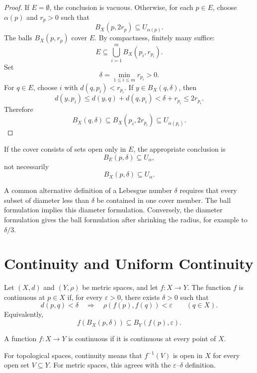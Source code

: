 \documentclass[answers,12pt,addpoints]{exam}
\begin{document}
\begin{proof}
If $E=\emptyset$, the conclusion is vacuous.
Otherwise, for each $p\in E$, choose $\alpha(p)$ and
$r_p>0$ such that
\[
B_X(p,2r_p)\subseteq U_{\alpha(p)}.
\]
The balls $B_X(p,r_p)$ cover $E$. By compactness, finitely
many suffice:
\[
E\subseteq\bigcup_{i=1}^{m}B_X(p_i,r_{p_i}).
\]
Set
\[
\delta=\min_{1\leq i\leq m}r_{p_i}>0.
\]
For $q\in E$, choose $i$ with $d(q,p_i)<r_{p_i}$.
If $y\in B_X(q,\delta)$, then
\[
d(y,p_i)
\leq d(y,q)+d(q,p_i)
<\delta+r_{p_i}
\leq 2r_{p_i}.
\]
Therefore
\[
B_X(q,\delta)
\subseteq B_X(p_i,2r_{p_i})
\subseteq U_{\alpha(p_i)}.
\]
\end{proof}

\begin{remark}
If the cover consists of sets open only in $E$, the
appropriate conclusion is
\[
B_E(p,\delta)\subseteq U_\alpha,
\]
not necessarily
\[
B_X(p,\delta)\subseteq U_\alpha.
\]

A common alternative definition of a Lebesgue number
$\delta$ requires that every subset of diameter less than
$\delta$ be contained in one cover member.
The ball formulation implies this diameter formulation.
Conversely, the diameter formulation gives the ball
formulation after shrinking the radius, for example
to $\delta/3$.
\end{remark}

\section{Continuity and Uniform Continuity}

\begin{definition}
Let $(X,d)$ and $(Y,\rho)$ be metric spaces, and let
$f:X\to Y$. The function $f$ is continuous at $p\in X$ if,
for every $\varepsilon>0$, there exists $\delta>0$ such that
\[
d(p,q)<\delta
\quad\Longrightarrow\quad
\rho(f(p),f(q))<\varepsilon
\qquad(q\in X).
\]
Equivalently,
\[
f(B_X(p,\delta))\subseteq B_Y(f(p),\varepsilon).
\]
\end{definition}

\begin{definition}[Continuity]
A function $f:X\to Y$ is continuous if it is continuous at
every point of $X$.

For topological spaces, continuity means that
$f^{-1}(V)$ is open in $X$ for every open set $V\subseteq Y$.
For metric spaces, this agrees with the
$\varepsilon$--$\delta$ definition.
\end{definition}
\end{document}
